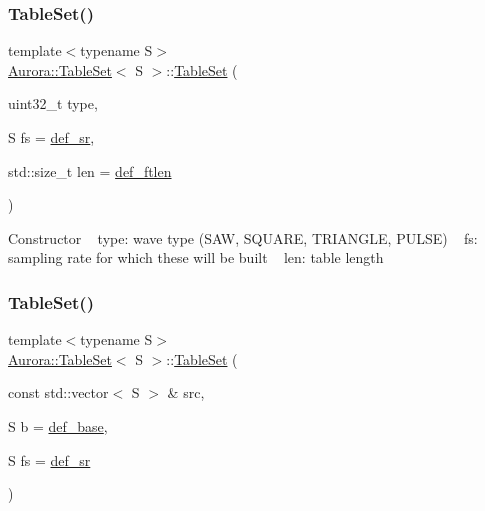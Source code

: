 \subsubsection{\texorpdfstring{Table\+Set()}{TableSet()}\hspace{0.1cm}{\footnotesize\ttfamily [1/4]}}
{\footnotesize\ttfamily template$<$typename S$>$ \\
\hyperlink{class_aurora_1_1_table_set}{Aurora\+::\+Table\+Set}$<$ S $>$\+::\hyperlink{class_aurora_1_1_table_set}{Table\+Set} (\begin{DoxyParamCaption}\item[{uint32\+\_\+t}]{type,  }\item[{S}]{fs = {\ttfamily \hyperlink{namespace_aurora_ad49263d809bea98dd422e95bc91bc03e}{def\+\_\+sr}},  }\item[{std\+::size\+\_\+t}]{len = {\ttfamily \hyperlink{namespace_aurora_a14dabfd9feedfa09c0e6f86d2627f006}{def\+\_\+ftlen}} }\end{DoxyParamCaption})\hspace{0.3cm}{\ttfamily [inline]}}

Constructor ~\newline
type\+: wave type (S\+AW, S\+Q\+U\+A\+RE, T\+R\+I\+A\+N\+G\+LE, P\+U\+L\+SE) ~\newline
fs\+: sampling rate for which these will be built ~\newline
len\+: table length \mbox{\label{class_aurora_1_1_table_set_a884ecfde480fdac4c32fa10a82286941}} 
\subsubsection{\texorpdfstring{Table\+Set()}{TableSet()}\hspace{0.1cm}{\footnotesize\ttfamily [2/4]}}
{\footnotesize\ttfamily template$<$typename S$>$ \\
\hyperlink{class_aurora_1_1_table_set}{Aurora\+::\+Table\+Set}$<$ S $>$\+::\hyperlink{class_aurora_1_1_table_set}{Table\+Set} (\begin{DoxyParamCaption}\item[{const std\+::vector$<$ S $>$ \&}]{src,  }\item[{S}]{b = {\ttfamily \hyperlink{namespace_aurora_acb267dff62f74484893c2d5b679b78bf}{def\+\_\+base}},  }\item[{S}]{fs = {\ttfamily \hyperlink{namespace_aurora_ad49263d809bea98dd422e95bc91bc03e}{def\+\_\+sr}} }\end{DoxyParamCaption})\hspace{0.3cm}{\ttfamily [inline]}}

